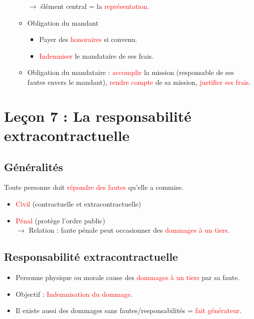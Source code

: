 \begin{itemize}
\begin{itemize}
		$\rightarrow$ élément central = la \textcolor{red}{représentation}.
		\item Obligation du mandant
		\begin{itemize}
		 	\item Payer des \textcolor{red}{honoraires} si convenu.
		 	\item \textcolor{red}{Indemniser} le mandataire de ses frais.
		 \end{itemize}
		 \item Obligation du mandataire : \textcolor{red}{accomplir} la mission (responsable de ses fautes envers le mandant), \textcolor{red}{rendre compte} de sa mission, \textcolor{red}{justifier ses frais}.
	\end{itemize}
\end{itemize}

\newpage
\chapter{Leçon 7 : La responsabilité extracontractuelle}

\section{Généralités}
Toute personne doit \textcolor{red}{répondre des fautes} qu'elle a commise.
\begin{itemize}
	\item \textcolor{red}{Civil} (contractuelle et extracontractuelle)
	\item \textcolor{red}{Pénal} (protège l'ordre public)\\
	$\rightarrow$ Relation : faute pénale peut occasionner des \textcolor{red}{dommages à un tiers.}
\end{itemize}

\section{Responsabilité extracontractuelle}
\begin{itemize}
	\item Personne physique ou morale cause des \textcolor{red}{dommages à un tiers} par sa faute.
	\item Objectif : \textcolor{red}{Indemnisation du dommage}.
	\item Il existe aussi des dommages sans fautes/responsabilités = \textcolor{red}{fait générateur}.
\end{itemize}


